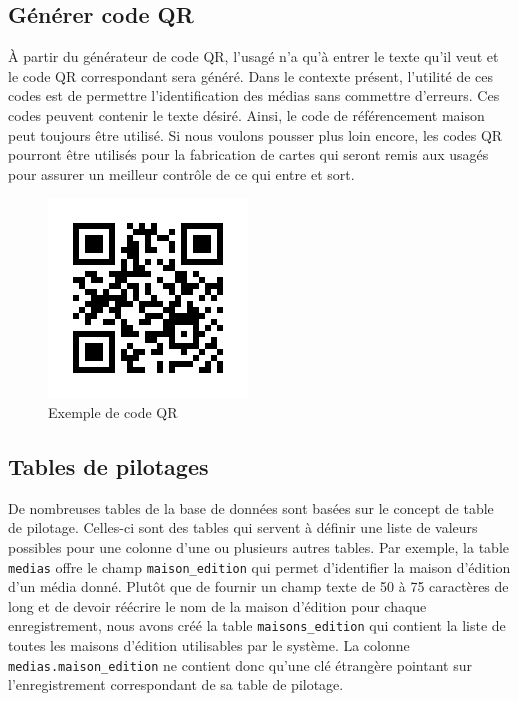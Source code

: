 \documentclass[letter, 11pt]{report}
\begin{document}
\subsection{Générer code QR}
À partir du générateur de code QR, l'usagé n'a qu'à entrer le texte qu'il veut et le code QR correspondant sera généré. Dans le contexte présent, l'utilité de ces codes est de permettre l'identification des médias sans commettre d'erreurs. Ces codes peuvent contenir le texte désiré. Ainsi, le code de référencement maison peut toujours être utilisé. Si nous voulons pousser plus loin encore, les codes QR pourront être utilisés pour la fabrication de cartes qui seront remis aux usagés pour assurer un meilleur contrôle de ce qui entre et sort.

\begin{figure}[htbp]
	\begin{center}
		\includegraphics[scale=0.5]{qr.png}
	\end{center}
	\caption{Exemple de code QR}
\end{figure}

\subsection{Tables de pilotages}
\label{sec:tables_de_pilotage}
De nombreuses tables de la base de données sont basées sur le concept de table de pilotage. Celles-ci sont des tables qui servent à définir une liste de valeurs possibles pour une colonne d'une ou plusieurs autres tables. Par exemple, la table \texttt{medias} offre le champ \texttt{maison\_edition} qui permet d'identifier la maison d'édition d'un média donné. Plutôt que de fournir un champ texte de 50 à 75 caractères de long et de devoir réécrire le nom de la maison d'édition pour chaque enregistrement, nous avons créé la table \texttt{maisons\_edition} qui contient la liste de toutes les maisons d'édition utilisables par le système. La colonne \texttt{medias.maison\_edition} ne contient donc qu'une clé étrangère pointant sur l'enregistrement correspondant de sa table de pilotage.
\end{document}

